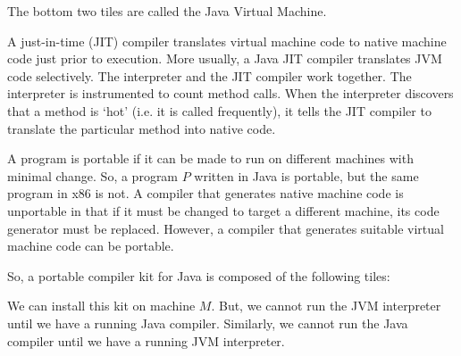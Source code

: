 \documentclass[a4paper, openany]{memoir}
\begin{document}
\noindent The bottom two tiles are called the Java Virtual Machine.

A just-in-time (JIT) compiler translates virtual machine code to native machine code just prior to execution. More usually, a Java JIT compiler translates JVM code selectively. The interpreter and the JIT compiler work together. The interpreter is instrumented to count method calls. When the interpreter discovers that a method is `hot' (i.e. it is called frequently), it tells the JIT compiler to translate the particular method into native code.

A program is portable if it can be made to run on different machines with minimal change. So, a program $P$ written in Java is portable, but the same program in x86 is not. A compiler that generates native machine code is unportable in that if it must be changed to target a different machine, its code generator must be replaced. However, a compiler that generates suitable virtual machine code can be portable.

So, a portable compiler kit for Java is composed of the following tiles:
\begin{figure}[H]
    \centering
\end{figure}
\noindent We can install this kit on machine $M$. But, we cannot run the JVM interpreter until we have a running Java compiler. Similarly, we cannot run the Java compiler until we have a running JVM interpreter.
\end{document}
